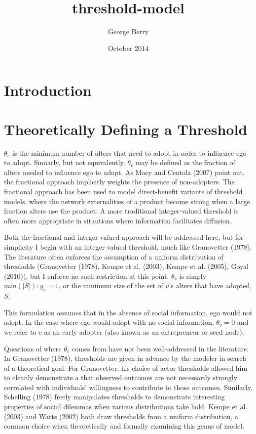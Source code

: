 \documentclass{article}
\title{threshold-model}
\author{George Berry}
\date{October 2014}
\begin{document}
\maketitle

\section{Introduction}

\section{Theoretically Defining a Threshold}

$\theta_v$ is the minimum number of alters that need to adopt in order to influence ego to adopt. Simiarly, but not equivalently, $\theta_v$ may be defined as the fraction of alters needed to influence ego to adopt. As Macy and Centola (2007) point out, the fractional approach implicitly weights the presence of non-adopters. The fractional approach has been used to model direct-benefit variants of threshold models, where the network externalities of a product become strong when a large fraction alters use the product. A more traditional integer-valued threshold is often more appropriate in sitautions where information facilitates diffusion. 

Both the fractional and integer-valued approach will be addressed here, but for simplicity I begin with an integer-valued threshold, much like Granovetter (1978). The literature often enforces the assumption of a uniform distribution of thresholds (Granovetter (1978), Kempe et al. (2003), Kempe et al. (2005), Goyal (2010)), but I enforce no such restriction at this point. $\theta_v$ is simply $min(|S|): y_v = 1$, or the minimum size of the set of $v$'s alters that have adopted, $S$.

This formulation assumes that in the absence of social information, ego would not adopt. In the case where ego would adopt with no social information, $\theta_v = 0$ and we refer to $v$ as an early adopter (also known as an entrepreneur or seed node).

Questions of where $\theta_v$ comes from have not been well-addressed in the literature. In Granovetter (1978), thresholds are given in advance by the modeler in search of a theoretical goal. For Granovetter, his choice of actor thresholds allowed him to cleanly demonstrate a that observed outcomes are not necessarily strongly correlated with individuals' willingness to contribute to those outcomes. Similarly, Schelling (1978) freely manipulates thresholds to demonstrate interesting properties of social dilemmas when various distributions take hold. Kempe et al. (2003) and Watts (2002) both draw thresholds from a uniform distribution, a common choice when theoretically and formally examining this genus of model.
\end{document}

